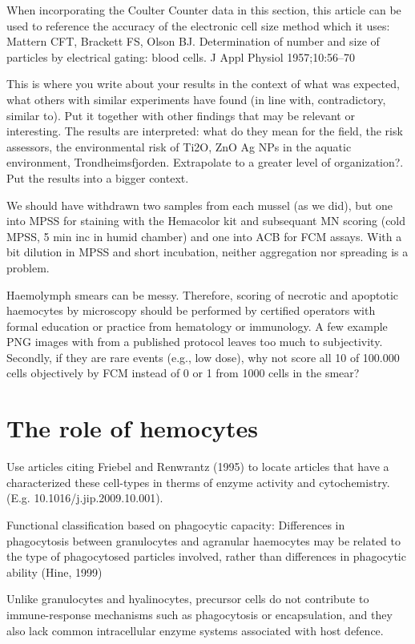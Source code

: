 When incorporating the Coulter Counter data in this section, this article can be used to reference the accuracy of the electronic cell size method which it uses: Mattern CFT, Brackett FS, Olson BJ. Determination of number and size of particles by electrical gating: blood cells. J Appl Physiol 1957;10:56–70

This is where you write about your results in the context of what was expected, what others with similar experiments have found (in line with, contradictory, similar to). Put it together with other findings that may be relevant or interesting. The results are interpreted: what do they mean for the field, the risk assessors, the environmental risk of Ti2O, ZnO Ag NPs in the aquatic environment, Trondheimsfjorden. Extrapolate to a greater level of organization?. Put the results into a bigger context.


We should have withdrawn two samples from each mussel (as we did), but one into MPSS for staining with the Hemacolor kit and subsequant MN scoring (cold MPSS, 5 min inc in humid chamber) and one into ACB for FCM assays. With a bit dilution in MPSS and short incubation, neither aggregation nor spreading is a problem.

Haemolymph smears can be messy. Therefore, scoring of necrotic and apoptotic haemocytes by microscopy should be performed by certified operators with formal education or practice from hematology or immunology. A few example PNG images with from a published protocol leaves too much to subjectivity. Secondly, if they are rare events (e.g., low dose), why not score all 10 of 100.000 cells objectively by FCM instead of 0 or 1 from 1000 cells in the smear?


\section{The role of hemocytes}
Use articles citing Friebel and Renwrantz (1995) to locate articles that have a characterized these cell-types in therms of enzyme activity and cytochemistry. (E.g. 10.1016/j.jip.2009.10.001).

Functional classification based on phagocytic capacity: Differences in phagocytosis between granulocytes and agranular haemocytes may be related to the type of phagocytosed particles involved, rather than differences in phagocytic ability (Hine, 1999)

Unlike granulocytes and hyalinocytes, precursor cells do not contribute to immune-response mechanisms such as phagocytosis or encapsulation, and they also lack common intracellular enzyme systems associated with host defence. 

